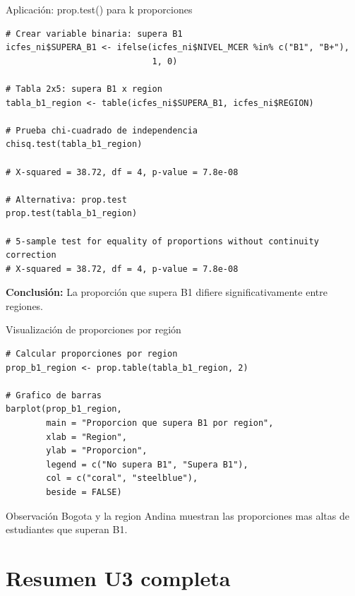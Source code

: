 \documentclass[aspectratio=169, 11pt]{beamer}
\begin{document}
\begin{frame}[fragile]{Aplicación: prop.test() para k proporciones}
\begin{lstlisting}
# Crear variable binaria: supera B1
icfes_ni$SUPERA_B1 <- ifelse(icfes_ni$NIVEL_MCER %in% c("B1", "B+"),
                             1, 0)

# Tabla 2x5: supera B1 x region
tabla_b1_region <- table(icfes_ni$SUPERA_B1, icfes_ni$REGION)

# Prueba chi-cuadrado de independencia
chisq.test(tabla_b1_region)

# X-squared = 38.72, df = 4, p-value = 7.8e-08

# Alternativa: prop.test
prop.test(tabla_b1_region)

# 5-sample test for equality of proportions without continuity correction
# X-squared = 38.72, df = 4, p-value = 7.8e-08
\end{lstlisting}

\textbf{Conclusión:} La proporción que supera B1 difiere significativamente entre regiones.
\end{frame}

\begin{frame}[fragile]{Visualización de proporciones por región}
\begin{lstlisting}
# Calcular proporciones por region
prop_b1_region <- prop.table(tabla_b1_region, 2)

# Grafico de barras
barplot(prop_b1_region,
        main = "Proporcion que supera B1 por region",
        xlab = "Region",
        ylab = "Proporcion",
        legend = c("No supera B1", "Supera B1"),
        col = c("coral", "steelblue"),
        beside = FALSE)
\end{lstlisting}

\vspace{0.2cm}
\begin{exampleblock}{Observación}
Bogota y la region Andina muestran las proporciones mas altas de estudiantes que superan B1.
\end{exampleblock}
\end{frame}

\section{Resumen U3 completa}
\end{document}
